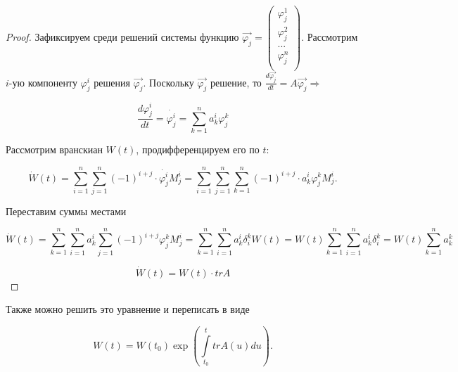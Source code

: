 \begin{proof}

Зафиксируем среди решений системы функцию $\overrightarrow{\varphi_j}=
\begin{pmatrix}
  \varphi_j^1 \\
  \varphi_j^2 \\
  ...   \\
  \varphi_j^n \\
\end{pmatrix}
$.
Рассмотрим $i$-ую компоненту $\varphi_j^i$ решения $\overrightarrow{\varphi_j}$. Поскольку $\overrightarrow{\varphi_j}$ решение, то $\frac{d\overrightarrow{\varphi_j}}{dt} = A\overrightarrow{\varphi_j} \Rightarrow$

\[\frac{d\varphi_j^i}{dt} = \dot{\varphi_j^i} = \sum\limits_{k = 1}^n{a_k^i \varphi_j^k}\]

Рассмотрим вранскиан $W(t)$, продифференцируем его по $t$:

\[\dot{W}(t) = \sum\limits_{i = 1}^n{\sum\limits_{j = 1}^n{(-1)^{i + j} \cdot \dot{\varphi_j^i} M_j^i}} = \sum\limits_{i = 1}^n{\sum\limits_{j = 1}^n{\sum\limits_{k = 1}^n{(-1)^{i + j} \cdot a_k^i \varphi_j^k M_j^i}}}.\]

Переставим суммы местами

\[\dot{W}(t) = \sum\limits_{k = 1}^n{\sum\limits_{i = 1}^n{a_k^i}{\sum\limits_{j = 1}^n{(-1)^{i + j} \varphi_j^k M_j^i}}} = \sum\limits_{k = 1}^n{\sum\limits_{i = 1}^n{a_k^i}\delta_i^k W(t)} = W(t)\sum\limits_{k = 1}^n{\sum\limits_{i = 1}^n{a_k^i}\delta_i^k} = W(t)\sum\limits_{k = 1}^n{a_k^k}\]

\[\dot{W}(t) = W(t) \cdot trA\]

\end{proof}

Также можно решить это уравнение и переписать в виде

\[W(t) = W(t_0)\exp{\left(\int\limits_{t_0}^{t}trA(u)du\right)}.\]

